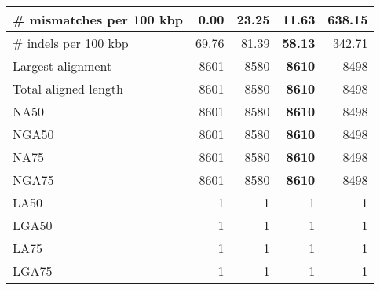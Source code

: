 \documentclass[12pt,a4paper]{article}
\begin{document}
\begin{table}[ht]
\begin{center}
\begin{tabular}{|l*{4}{|r}|}
\# mismatches per 100 kbp & {\bf 0.00} & 23.25 & 11.63 & 638.15 \\ \hline
\# indels per 100 kbp & 69.76 & 81.39 & {\bf 58.13} & 342.71 \\ \hline
Largest alignment & 8601 & 8580 & {\bf 8610} & 8498 \\ \hline
Total aligned length & 8601 & 8580 & {\bf 8610} & 8498 \\ \hline
NA50 & 8601 & 8580 & {\bf 8610} & 8498 \\ \hline
NGA50 & 8601 & 8580 & {\bf 8610} & 8498 \\ \hline
NA75 & 8601 & 8580 & {\bf 8610} & 8498 \\ \hline
NGA75 & 8601 & 8580 & {\bf 8610} & 8498 \\ \hline
LA50 & 1 & 1 & 1 & 1 \\ \hline
LGA50 & 1 & 1 & 1 & 1 \\ \hline
LA75 & 1 & 1 & 1 & 1 \\ \hline
LGA75 & 1 & 1 & 1 & 1 \\ \hline
\end{tabular}
\end{center}
\end{table}
\end{document}
